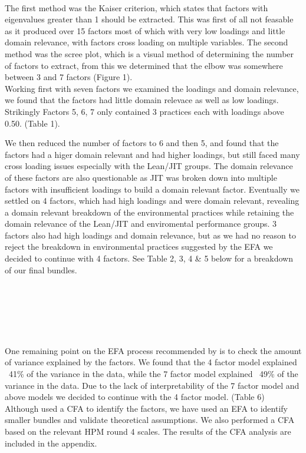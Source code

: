 \\
The first method was the Kaiser criterion, which states that factors with eigenvalues greater than 1 should be extracted.
This was first of all not feasable as it produced over 15 factors most of which with very low loadings and little domain relevance, with factors cross loading on multiple variables.
The second method was the scree plot, which is a visual method of determining the number of factors to extract, from this we determined that the elbow was somewhere between 3 and 7 factors (Figure 1). 
\\ 
Working first with seven factors we examined the loadings and domain relevance, we found that the factors had little domain relevace as well as low loadings. Strikingly Factors 5, 6, 7 only contained 3 practices each with loadings above 0.50. (Table 1).

We then reduced the number of factors to 6 and then 5, and found that the factors had a higer domain relevant and had higher loadings, but still faced many cross loading issues especially with the Lean/JIT groups.
The domain relevance of these factors are also questionable as JIT was broken down into multiple factors with insufficient loadings to build a domain relevant factor.
Eventually we settled on 4 factors, which had high loadings and were domain relevant, revealing a domain relevant breakdown of the environmental practices while retaining the domain relevance of the Lean/JIT and enviromental performance groups.
3 factors also had high loadings and domain relevance, but as we had no reason to reject the breakdown in environmental practices suggested by the EFA we decided to continue with 4 factors. See Table 2, 3, 4 \& 5 below for a breakdown of our final bundles.
 \\
 \\
 \\
 \\\\
 \\\\
One remaining point on the EFA process recommended by \citep{beaversPracticalConsiderationsUsing2013} is to check the amount of variance explained by the factors.
We found that the 4 factor model explained ~41\% of the variance in the data, while the 7 factor model explained ~49\% of the variance in the data.
Due to the lack of interpretability of the 7 factor model and above models we decided to continue with the 4 factor model. (Table 6)
\\
Although \citep{furlanComplementarityLeanManufacturing2011} used a CFA to identify the factors, we have used an EFA to identify smaller bundles and validate theoretical assumptions. We also performed a CFA based on the relevant HPM round 4 scales. The results of the CFA analysis are included in the appendix.
